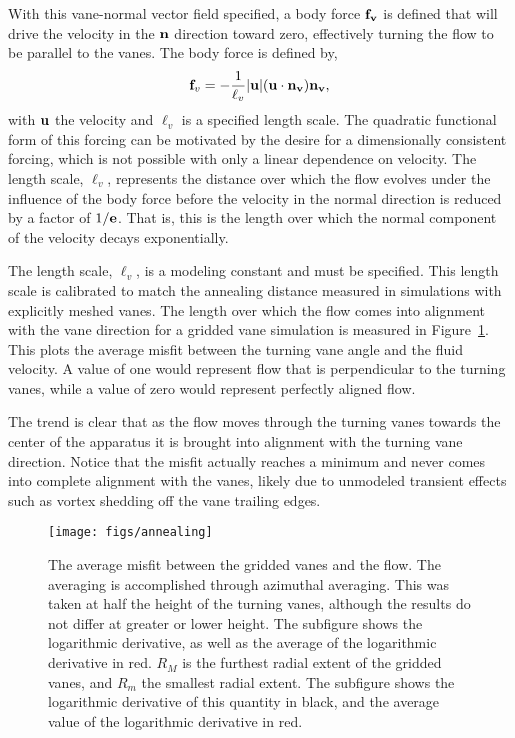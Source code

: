 With this vane-normal vector field specified, a body force ${\bf f_v}$
is defined that will drive the velocity in the ${\bf n}$ direction
toward zero, effectively turning the flow to be parallel to the
vanes. The body force is defined by,
\begin{equation}
 {\bf f}_v= -\frac{1}{\ell_v}|{\bf u}|({\bf u}\cdot{\bf n_v}){\bf n_v},
 \label{eqn:body_force}
\end{equation}
with ${\bf u}$ the velocity and $\ell_v$ is a specified length
scale. The quadratic functional form of this forcing can be motivated by 
the desire for a dimensionally consistent forcing, which is not possible
with only a linear dependence on velocity. The length scale, $\ell_v$,
represents the distance over which the 
flow evolves under the influence of the body force before the
velocity in the normal direction is reduced by a factor of $1/{\bf 
e}$. That is, this is the length over which the normal component of the
velocity decays exponentially. 

The length scale, $\ell_v$, is a modeling constant and must be
specified. This length scale is calibrated to match the annealing
distance measured in simulations with explicitly meshed vanes. The
length over which the flow comes into alignment with the vane direction
for a gridded vane simulation is measured in
Figure~\ref{fig:annealing}. This plots the average misfit between the
turning vane angle and the fluid velocity. A value of one would
represent flow that is perpendicular to the turning vanes, while a value
of zero would represent perfectly aligned flow.  

The trend is clear that as the flow moves through the turning vanes
towards the center of the apparatus it is brought into alignment with
the turning vane direction. Notice that the misfit actually reaches a
minimum and never comes into complete alignment with the vanes, likely
due to unmodeled transient effects such as vortex shedding off the vane
trailing edges.  


   \begin{figure}[!htb]
    \centering
    \texttt{[image: figs/annealing]}
     \caption{The average misfit between the gridded vanes and the
    flow. The averaging is accomplished through azimuthal
    averaging. This was taken at half the height of the turning vanes,
    although the results do not differ at greater or lower height. 
    The subfigure shows the logarithmic derivative, as well as the
    average of the logarithmic derivative in red. 
    $R_{M}$ is the furthest radial extent of the gridded vanes,
    and $R_{m}$ the smallest radial extent. The subfigure shows the
    logarithmic derivative of this quantity in black, and the average
    value of the logarithmic derivative in red.}
     \label{fig:annealing}
   \end{figure}

